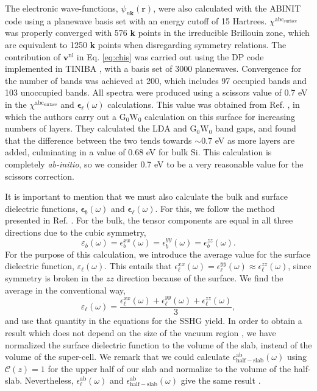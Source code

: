 The electronic wave-functions, $\psi_{n\mathbf{k}}(\mathbf{r})$, were also
calculated with the ABINIT code using a planewave basis set with an energy
cutoff of 15 Hartrees. $\chi^{\mathrm{abc}_{\mathrm{surface}}}$ was properly
converged with 576 \textbf{k} points in the irreducible Brillouin zone, which
are equivalent to 1250 \textbf{k} points when disregarding symmetry relations.
The contribution of $\mathbf{v}^\mathrm{nl}$ in Eq. \eqref{eq:chis} was carried
out using the DP \cite{olevanoDP} code implemented in TINIBA \cite{tiniba}, with
a basis set of 3000 planewaves. Convergence for the number of bands was achieved
at 200, which includes 97 occupied bands and 103 unoccupied bands. All spectra
were produced using a scissors value of 0.7 eV in the
$\chi^{\mathrm{abc}_{\mathrm{surface}}}$ and
$\boldsymbol{\epsilon}_{\ell}(\omega)$ calculations. This value was obtained
from Ref. \cite{liPRB10}, in which the authors carry out a
$\mathrm{G}_{0}\mathrm{W}_{0}$ calculation on this surface for increasing
numbers of layers. They calculated the LDA and $\mathrm{G}_{0}\mathrm{W}_{0}$
band gaps, and found that the difference between the two tends towards $\sim0.7$
eV as more layers are added, culminating in a value of 0.68 eV for bulk Si. This
calculation is completely \emph{ab-initio}, so we consider 0.7 eV to be a very
reasonable value for the scissors correction.

It is important to mention that we must also calculate the bulk and surface
dielectric functions, $\boldsymbol{\epsilon}_b(\omega)$ and
$\boldsymbol{\epsilon}_\ell(\omega)$. For this, we follow the method presented
in Ref. \cite{mendozaPRB06}. For the bulk, the tensor components are equal in
all three directions due to the cubic symmetry,
\begin{equation*}
\varepsilon_{b}(\omega) = 
\epsilon^{xx}_{b}(\omega) = 
\epsilon^{yy}_{b}(\omega) = 
\epsilon^{zz}_{b}(\omega).
\end{equation*}
For the purpose of this calculation, we introduce the average value for the
surface dielectric function, $\varepsilon_\ell(\omega)$. This entails that
$\epsilon^{xx}_{\ell}(\omega) = \epsilon^{yy}_{\ell}(\omega) \approx
\epsilon^{zz}_{\ell}(\omega)$, since symmetry is broken in the $zz$ direction
because of the surface. We find the average in the conventional way,
\begin{equation*}
\varepsilon_{\ell}(\omega) = 
\frac{\epsilon^{xx}_{\ell}(\omega) + 
\epsilon^{yy}_{\ell}(\omega) + 
\epsilon^{zz}_{\ell}(\omega)}{3},
\end{equation*}
and use that quantity in the equations for the SSHG yield. In order to obtain a
result which does not depend on the size of the vacuum region
\cite{nicolasPRB15}, we have normalized the surface dielectric function to the
volume of the slab, instead of the volume of the super-cell. We remark that we
could calculate $\epsilon^{\mathrm{ab}}_{\mathrm{half-slab}}(\omega)$ using
${\mathcal{C}}(z)=1$ for the upper half of our slab and normalize to the volume
of the half-slab. Nevertheless, $\epsilon^{\mathrm{ab}}_{\ell}(\omega)$ and
$\epsilon^{\mathrm{ab}}_{\mathrm{half-slab}}(\omega)$ give the same
result \cite{hoganPRB03, castilloPRB03, nicolasPRB15}.

